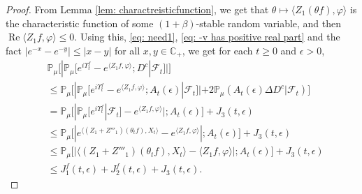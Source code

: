 \documentclass[12pt,a4paper]{amsart}
\theoremstyle{plain}
\theoremstyle{definition}
\numberwithin{equation}{section}
\begin{document}
\begin{proof}
 From Lemma \ref{lem: charactreisticfunction}, we  get that $\theta\mapsto \langle Z_1(\theta f),\varphi\rangle$ is the characteristic function of some $(1+\beta)$-stable random variable, and then  $\operatorname{Re} \langle Z_1f, \varphi\rangle \leq 0$.
Using this, \eqref{eq: need1}, \eqref{eq: -v has positive real part} and the fact $|e^{-x} - e^{-y}| \leq |x-y|$ for all $x,y \in \mathbb C_+$, we get for each $t\geq 0$ and $\epsilon> 0$,
\begin{align}
  \label{eq: inequality that will used later}
  & \mathbb{P}_\mu \Big[ |  \mathbb{P}_\mu [ e^{i\Upsilon^f_t} - e^{\langle Z_1f,\varphi \rangle} ; D^c | \mathscr F_{t}]   |\Big]  \\
  &  \leq \mathbb{P}_\mu   \Big[ |    \mathbb{P}_\mu [ e^{i \Upsilon^f_t }-e^{\langle Z_1f, \varphi\rangle}; A_{t}(\epsilon) | \mathscr F_{t}] |  + 2\mathbb P_\mu ( A_{t}(\epsilon) \Delta D^c | \mathscr F_{t}) \Big] \\
  & = \mathbb{P}_{\mu}\Big[ |\mathbb{P}_\mu [e^{i\Upsilon^f_t}| \mathscr F_{t}]-e^{\langle Z_1f, \varphi\rangle}| ; A_{t}(\epsilon) \Big] + J_3(t,\epsilon) \\
  & \leq \mathbb{P}_\mu \Big[ |e^{\langle (Z_1+Z'''_1) (\theta_t f),X_{t} \rangle}-e^{\langle Z_1f, \varphi\rangle} | ; A_{t}(\epsilon) \Big]+  J_3(t,\epsilon) \\
  & \leq \mathbb{P}_\mu \Big[ | \langle (Z_1+Z'''_1)(\theta_t f),X_{t} \rangle - \langle Z_1f, \varphi\rangle | ;A_{t}(\epsilon)\Big]+  J_3(t,\epsilon) \\
  & \leq J^f_1(t,\epsilon) + J^f_2(t,\epsilon)+ J_3(t,\epsilon).
\end{align}


\end{proof}
\end{document}
